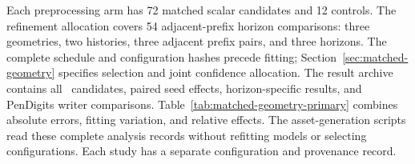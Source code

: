 Each preprocessing arm has 72 matched scalar candidates and 12 controls.
The refinement allocation covers 54 adjacent-prefix horizon comparisons:
three geometries, two histories, three adjacent prefix pairs, and three
horizons. The complete schedule and configuration hashes precede fitting;
Section~\ref{sec:matched-geometry} specifies selection and joint confidence
allocation. The result archive contains all \MatchedCandidates\ candidates, paired seed
effects, horizon-specific results, and PenDigits writer comparisons.
Table~\ref{tab:matched-geometry-primary} combines absolute errors, fitting
variation, and relative effects. The asset-generation scripts read these complete analysis records without
refitting models or selecting configurations. Each study has a separate
configuration and provenance record.
